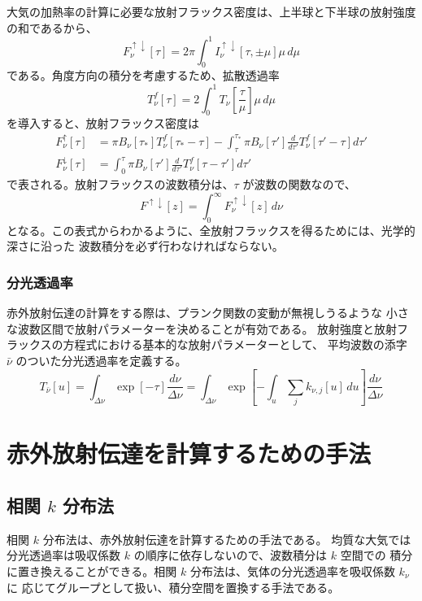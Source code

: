 \documentclass[book]{dennou777}
\begin{document}
大気の加熱率の計算に必要な放射フラックス密度は、上半球と下半球の放射強度の和であるから、
\begin{equation}
	F^{\uparrow\downarrow}_\nu[\tau]=2\pi\int^1_0 I^{\uparrow\downarrow}_\nu[\tau,\pm\mu]\mu\,d\mu
\end{equation}
である。角度方向の積分を考慮するため、拡散透過率
\begin{equation}
	T^f_\nu[\tau]=2\int^1_0 T_\nu\left[\frac{\tau}{\mu}\right]\mu\,d\mu
\end{equation}
を導入すると、放射フラックス密度は
\begin{align}
	F^\uparrow_\nu[\tau]
		&=\pi B_\nu[\tau_*]T^f_\nu[\tau_*-\tau]
		-\int^{\tau_*}_\tau \pi B_\nu[\tau']\frac{d}{d\tau'}T^f_\nu[\tau'-\tau]d\tau'\\
	F^\downarrow_\nu[\tau]
		&=\int^\tau_0 \pi B_\nu[\tau']\frac{d}{d\tau'}T^f_\nu[\tau-\tau']d\tau'
\end{align}
で表される。放射フラックスの波数積分は、$\tau$ が波数の関数なので、
\begin{equation}
	F^{\uparrow\downarrow}[z]=\int^\infty_0 F^{\uparrow\downarrow}_\nu[z]\,d\nu
\end{equation}
となる。この表式からわかるように、全放射フラックスを得るためには、光学的深さに沿った
波数積分を必ず行わなければならない。

\subsection{分光透過率}
赤外放射伝達の計算をする際は、プランク関数の変動が無視しうるような
小さな波数区間で放射パラメーターを決めることが有効である。
放射強度と放射フラックスの方程式における基本的な放射パラメーターとして、
平均波数の添字 $\bar\nu$ のついた分光透過率を定義する。
\begin{equation}
	T_{\bar\nu}[u]
	=\int_{\Delta\nu}\exp[-\tau]\frac{d\nu}{\Delta\nu}
	=\int_{\Delta\nu}\exp\left[-\int_u\sum_j k_{\nu,j}[u]\,du\right]\frac{d\nu}{\Delta\nu}
\end{equation}

\chapter{赤外放射伝達を計算するための手法}

\section{相関 $k$ 分布法}
相関 $k$ 分布法は、赤外放射伝達を計算するための手法である。
均質な大気では分光透過率は吸収係数 $k$ の順序に依存しないので、波数積分は $k$ 空間での
積分に置き換えることができる。相関 $k$ 分布法は、気体の分光透過率を吸収係数 $k_\nu$ に
応じてグループとして扱い、積分空間を置換する手法である。
\end{document}

